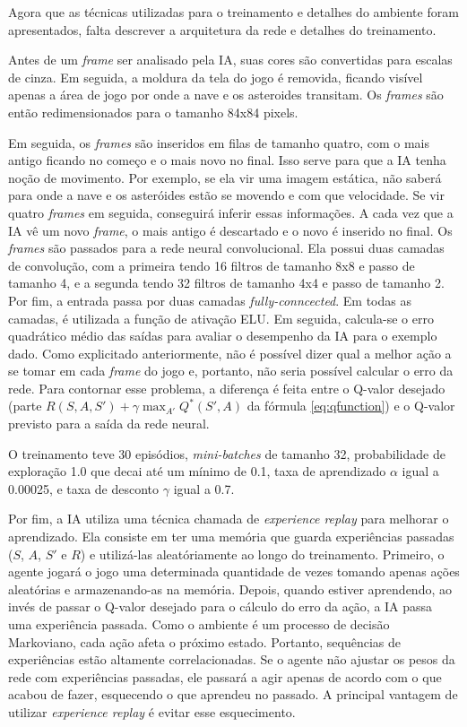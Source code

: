 Agora que as técnicas utilizadas para o treinamento e detalhes do ambiente foram apresentados, falta descrever a arquitetura da rede e detalhes do treinamento.

Antes de um \textit{frame} ser analisado pela IA, suas cores são convertidas para escalas de cinza.
Em seguida, a moldura da tela do jogo é removida, ficando visível apenas a área de jogo por onde a nave e os asteroides transitam.
Os \textit{frames} são então redimensionados para o tamanho 84x84 pixels.

Em seguida, os \textit{frames} são inseridos em filas de tamanho quatro, com o mais antigo ficando no começo e o mais novo no final. Isso serve para que a IA tenha noção de movimento.
Por exemplo, se ela vir uma imagem estática, não saberá para onde a nave e os asteróides estão se movendo e com que velocidade.
Se vir quatro \textit{frames} em seguida, conseguirá inferir essas informações.
A cada vez que a IA vê um novo \textit{frame}, o mais antigo é descartado e o novo é inserido no final.
Os \textit{frames} são passados para a rede neural convolucional. Ela possui duas camadas de convolução, com a primeira tendo 16 filtros de tamanho 8x8 e passo de tamanho 4, e a segunda tendo 32 filtros de tamanho 4x4 e passo de tamanho 2.
Por fim, a entrada passa por duas camadas \textit{fully-conncected}.
Em todas as camadas, é utilizada a função de ativação ELU.
Em seguida, calcula-se o erro quadrático médio das saídas para avaliar o desempenho da IA para o exemplo dado.
Como explicitado anteriormente, não é possível dizer qual a melhor ação a se tomar em cada \textit{frame} do jogo e, portanto, não seria possível calcular o erro da rede.
Para contornar esse problema, a diferença é feita entre o Q-valor desejado (parte $R(S,A,S') + \gamma\max_{A'}Q^{*}(S',A)$ da fórmula \ref{eq:qfunction}) e o Q-valor previsto para a saída da rede neural.

O treinamento teve 30 episódios, \textit{mini-batches} de tamanho 32, probabilidade de exploração 1.0 que decai até um mínimo de 0.1, taxa de aprendizado $\alpha$ igual a 0.00025, e taxa de desconto $\gamma$ igual a 0.7.

Por fim, a IA utiliza uma técnica chamada de \textit{experience replay} para melhorar o aprendizado. Ela consiste em ter uma memória que guarda experiências passadas ($S$, $A$, $S'$ e $R$) e utilizá-las aleatóriamente ao longo do treinamento.
Primeiro, o agente jogará o jogo uma determinada quantidade de vezes tomando apenas ações aleatórias e armazenando-as na memória.
Depois, quando estiver aprendendo, ao invés de passar o Q-valor desejado para o cálculo do erro da ação, a IA passa uma experiência passada.
Como o ambiente é um processo de decisão Markoviano, cada ação afeta o próximo estado. Portanto, sequências de experiências estão altamente correlacionadas. Se o agente não ajustar os pesos da rede com experiências passadas, ele passará a agir apenas de acordo com o que acabou de fazer, esquecendo o que aprendeu no passado.
A principal vantagem de utilizar \textit{experience replay} é evitar esse esquecimento.
